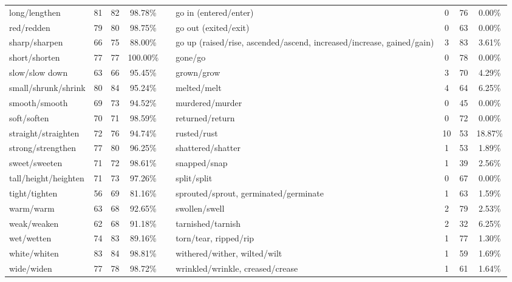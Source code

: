 \begin{tabular}{p{3cm}ccccp{3cm}ccc}
long/lengthen & 81 & 82 & 98.78\% & & go in (entered/enter) & 0 & 76 & 0.00\% \\
red/redden & 79 & 80 & 98.75\% & & go out (exited/exit) & 0 & 63 & 0.00\% \\
sharp/sharpen & 66 & 75 & 88.00\% & & go up (raised/rise, ascended/ascend, increased/increase, gained/gain) & 3 & 83 & 3.61\% \\
short/shorten & 77 & 77 & 100.00\% & & gone/go & 0 & 78 & 0.00\% \\
slow/slow down & 63 & 66 & 95.45\% & & grown/grow & 3 & 70 & 4.29\% \\
small/shrunk/shrink & 80 & 84 & 95.24\% & & melted/melt & 4 & 64 & 6.25\% \\
smooth/smooth & 69 & 73 & 94.52\% & & murdered/murder & 0 & 45 & 0.00\% \\
soft/soften & 70 & 71 & 98.59\% & & returned/return & 0 & 72 & 0.00\% \\
straight/straighten & 72 & 76 & 94.74\% & & rusted/rust & 10 & 53 & 18.87\% \\
strong/strengthen & 77 & 80 & 96.25\% & & shattered/shatter & 1 & 53 & 1.89\% \\
sweet/sweeten & 71 & 72 & 98.61\% & & snapped/snap & 1 & 39 & 2.56\% \\
tall/height/heighten & 71 & 73 & 97.26\% & & split/split & 0 & 67 & 0.00\% \\
tight/tighten & 56 & 69 & 81.16\% & & sprouted/sprout, germinated/germinate & 1 & 63 & 1.59\% \\
warm/warm & 63 & 68 & 92.65\% & & swollen/swell & 2 & 79 & 2.53\% \\
weak/weaken & 62 & 68 & 91.18\% & & tarnished/tarnish & 2 & 32 & 6.25\% \\
wet/wetten & 74 & 83 & 89.16\% & & torn/tear, ripped/rip & 1 & 77 & 1.30\% \\
white/whiten & 83 & 84 & 98.81\% & & withered/wither, wilted/wilt & 1 & 59 & 1.69\% \\
wide/widen & 77 & 78 & 98.72\% & & wrinkled/wrinkle, creased/crease & 1 & 61 & 1.64\%
\end{tabular}